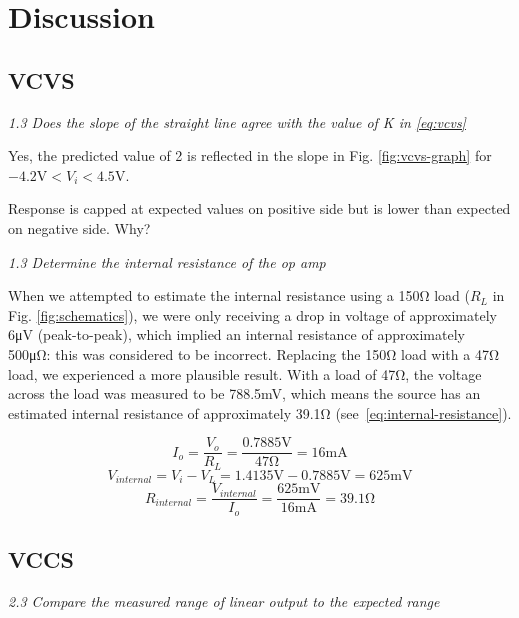 \section{Discussion}\label{sec:discussion}
\subsection{VCVS}
\textit{1.3 Does the slope of the straight line agree with the value of K in \eqref{eq:vcvs}}

Yes, the predicted value of 2 is reflected in the slope in Fig. \ref{fig:vcvs-graph} for $-4.2\si{\volt}<V_i<4.5\si{\volt}$.

Response is capped at expected values on positive side but is lower than expected on negative side. Why?

\textit{1.3 Determine the internal resistance of the op amp}

When we attempted to estimate the internal resistance using a 150\si{\ohm} load ($R_L$ in Fig. \ref{fig:schematics}), we were only receiving a drop in voltage of approximately 6\si{\micro\volt} (peak-to-peak), which implied an internal resistance of approximately 500\si{\micro\ohm}: this was considered to be incorrect. Replacing the 150\si{\ohm} load with a 47\si{\ohm} load, we experienced a more plausible result. With a load of 47\si{\ohm}, the voltage across the load was measured to be 788.5\si{\milli\volt}, which means the source has an estimated internal resistance of approximately 39.1\si{\ohm} (see~\eqref{eq:internal-resistance}).

\begin{equation*}
I_o	= \frac{V_o}{R_L} = \frac{0.7885\si{\volt}}{47\si{\ohm}} = 16\si{\milli\ampere}
\end{equation*}
\begin{equation*}
V_{internal}		= V_i - V_L = 1.4135\si{\volt} - 0.7885\si{\volt} = 625\si{\milli\volt}
\end{equation*}
\begin{equation}
\label{eq:internal-resistance}
R_{internal}	= \frac{V_{internal}}{I_o} = \frac{625\si{\milli\volt}}{16\si{\milli\ampere}} = 39.1\si{\ohm}
\end{equation}

\subsection{VCCS}
\textit{2.3 Compare the measured range of linear output to the expected range}

